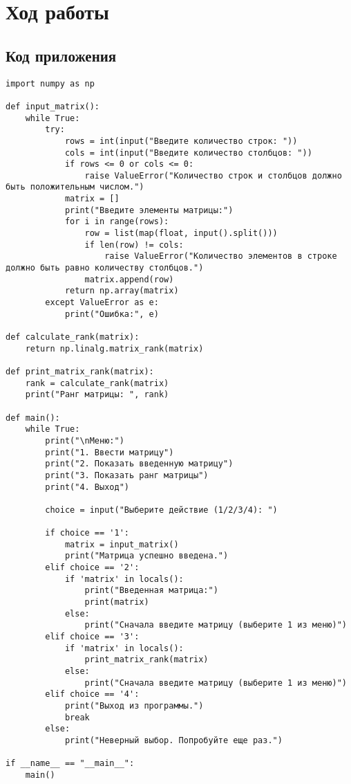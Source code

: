 \documentclass{article}
\begin{document}
\section{Ход работы}
\label{sec:exp}

\subsection{Код приложения}
\label{sec:exp:code}
\begin{verbatim}
import numpy as np

def input_matrix():
    while True:
        try:
            rows = int(input("Введите количество строк: "))
            cols = int(input("Введите количество столбцов: "))
            if rows <= 0 or cols <= 0:
                raise ValueError("Количество строк и столбцов должно быть положительным числом.")
            matrix = []
            print("Введите элементы матрицы:")
            for i in range(rows):
                row = list(map(float, input().split()))
                if len(row) != cols:
                    raise ValueError("Количество элементов в строке должно быть равно количеству столбцов.")
                matrix.append(row)
            return np.array(matrix)
        except ValueError as e:
            print("Ошибка:", e)

def calculate_rank(matrix):
    return np.linalg.matrix_rank(matrix)

def print_matrix_rank(matrix):
    rank = calculate_rank(matrix)
    print("Ранг матрицы: ", rank)

def main():
    while True:
        print("\nМеню:")
        print("1. Ввести матрицу")
        print("2. Показать введенную матрицу")
        print("3. Показать ранг матрицы")
        print("4. Выход")

        choice = input("Выберите действие (1/2/3/4): ")

        if choice == '1':
            matrix = input_matrix()
            print("Матрица успешно введена.")
        elif choice == '2':
            if 'matrix' in locals():
                print("Введенная матрица:")
                print(matrix)
            else:
                print("Сначала введите матрицу (выберите 1 из меню)")
        elif choice == '3':
            if 'matrix' in locals():
                print_matrix_rank(matrix)
            else:
                print("Сначала введите матрицу (выберите 1 из меню)")
        elif choice == '4':
            print("Выход из программы.")
            break
        else:
            print("Неверный выбор. Попробуйте еще раз.")

if __name__ == "__main__":
    main()

\end{verbatim}
\end{document}
